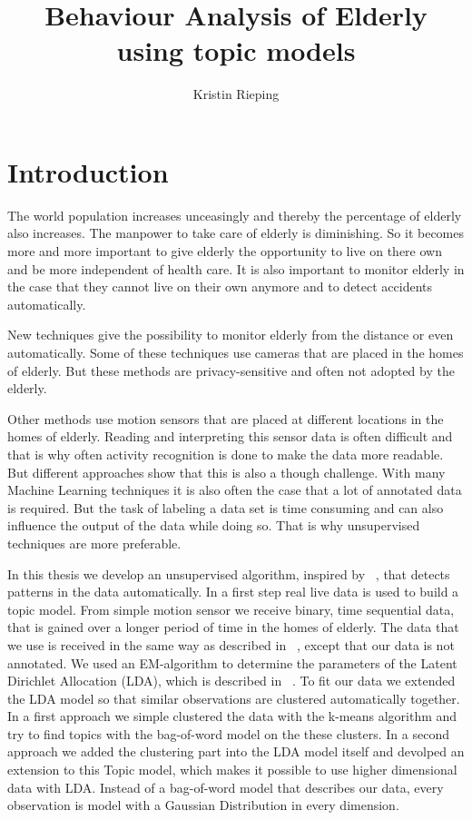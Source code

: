 \documentclass[11pt,a4paper]{article}
\title{Behaviour Analysis of Elderly using topic models}
\author{Kristin Rieping}
\begin{document}
\maketitle
\pagebreak
\tableofcontents
\pagebreak
\section{Introduction}
The world population increases unceasingly and thereby the percentage of elderly also increases. The manpower to take care of elderly is diminishing. So it becomes more and more important to give elderly the opportunity to live on there own and be more independent of health care. It is also important to monitor elderly in the case that they cannot live on their own anymore and to detect accidents automatically. %

New techniques give the possibility to monitor elderly from the distance or even automatically. Some of these techniques use cameras that are placed in the homes of elderly. But these methods are privacy-sensitive and often not adopted by the elderly.



Other methods use motion sensors that are placed at different locations in the homes of elderly. %
Reading and interpreting this sensor data is often difficult and that is why often activity recognition is done to make the data more readable. But different approaches show that this is also a though challenge.
With many Machine Learning techniques it is also often the case that a lot of annotated data is required.  But the task of labeling a data set is time consuming and can also influence the output of the data while doing so. That is why unsupervised techniques are more preferable.

In this thesis we develop an unsupervised algorithm, inspired by ~\cite{farrahi2008daily}, that detects patterns in the data automatically. 
In a first step real live data is used to build a topic model. From simple motion sensor we receive binary, time sequential data, that is gained over a longer period of time in the homes of elderly. The data that we use is received in the same way as described in ~\cite{van2010activity}, except that our data is not annotated. We used an EM-algorithm to determine the parameters of the Latent Dirichlet Allocation (LDA), which is described in ~\cite{blei2003latent}. To fit our data we extended the LDA model so that similar observations are clustered automatically together.
In a first approach we simple clustered the data with the k-means algorithm and try to find topics with the bag-of-word model on the these clusters. In a second approach we added the clustering part into the LDA model itself and devolped an extension to this Topic model, which makes it possible to use higher dimensional data with LDA. Instead of a bag-of-word model that describes our data, every observation is model with a Gaussian Distribution in every dimension.
\end{document}
